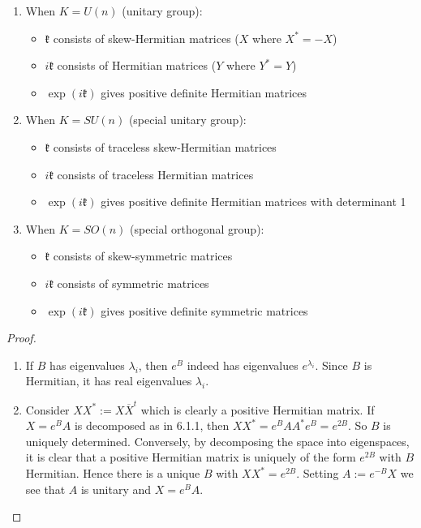 \documentclass[12pt]{article}
\begin{document}
\begin{enumerate}
    \item When $K = U(n)$ (unitary group):
          \begin{itemize}
              \item $\mathfrak{k}$ consists of skew-Hermitian matrices ($X$ where $X^* = -X$)
              \item $i\mathfrak{k}$ consists of Hermitian matrices ($Y$ where $Y^* = Y$)
              \item $\exp(i\mathfrak{k})$ gives positive definite Hermitian matrices
          \end{itemize}

    \item When $K = SU(n)$ (special unitary group):
          \begin{itemize}
              \item $\mathfrak{k}$ consists of traceless skew-Hermitian matrices
              \item $i\mathfrak{k}$ consists of traceless Hermitian matrices
              \item $\exp(i\mathfrak{k})$ gives positive definite Hermitian matrices with determinant 1
          \end{itemize}

    \item When $K = SO(n)$ (special orthogonal group):
          \begin{itemize}
              \item $\mathfrak{k}$ consists of skew-symmetric matrices
              \item $i\mathfrak{k}$ consists of symmetric matrices
              \item $\exp(i\mathfrak{k})$ gives positive definite symmetric matrices
          \end{itemize}
\end{enumerate}
\begin{proof}
    \begin{enumerate}
        \item If $B$ has eigenvalues $\lambda_i$, then $e^B$ indeed has eigenvalues $e^{\lambda_i}$. Since $B$ is Hermitian, it has real eigenvalues $\lambda_i$.

        \item Consider $XX^* := X\overline{X}^t$ which is clearly a positive Hermitian matrix. If $X = e^B A$ is decomposed as in 6.1.1, then $XX^* = e^B AA^*e^B = e^{2B}$. So $B$ is uniquely determined. Conversely, by decomposing the space into eigenspaces, it is clear that a positive Hermitian matrix is uniquely of the form $e^{2B}$ with $B$ Hermitian. Hence there is a unique $B$ with $XX^* = e^{2B}$. Setting $A := e^{-B} X$ we see that $A$ is unitary and $X = e^B A$.
    \end{enumerate}
\end{proof}
\end{document}
